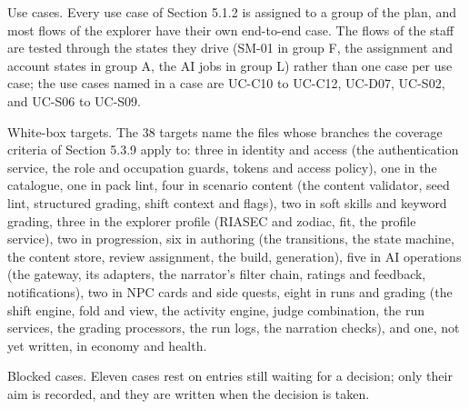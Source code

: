 Use cases. Every use case of Section 5.1.2 is assigned to a group of the plan, and most flows of the explorer have their own end-to-end case. The flows of the staff are tested through the states they drive (SM-01 in group F, the assignment and account states in group A, the AI jobs in group L) rather than one case per use case; the use cases named in a case are UC-C10 to UC-C12, UC-D07, UC-S02, and UC-S06 to UC-S09.

White-box targets. The 38 targets name the files whose branches the coverage criteria of Section 5.3.9 apply to: three in identity and access (the authentication service, the role and occupation guards, tokens and access policy), one in the catalogue, one in pack lint, four in scenario content (the content validator, seed lint, structured grading, shift context and flags), two in soft skills and keyword grading, three in the explorer profile (RIASEC and zodiac, fit, the profile service), two in progression, six in authoring (the transitions, the state machine, the content store, review assignment, the build, generation), five in AI operations (the gateway, its adapters, the narrator's filter chain, ratings and feedback, notifications), two in NPC cards and side quests, eight in runs and grading (the shift engine, fold and view, the activity engine, judge combination, the run services, the grading processors, the run logs, the narration checks), and one, not yet written, in economy and health.

Blocked cases. Eleven cases rest on entries still waiting for a decision; only their aim is recorded, and they are written when the decision is taken.

